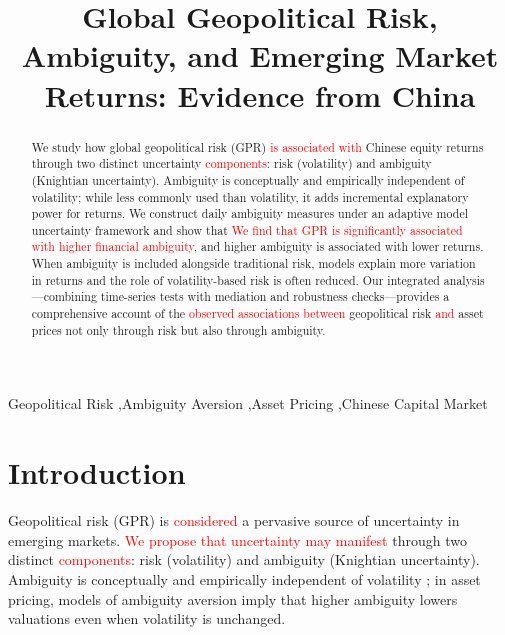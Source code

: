 \documentclass[preprint,12pt,authoryear]{elsarticle}
\begin{document}
\begin{frontmatter}

\title{Global Geopolitical Risk, Ambiguity, and Emerging Market Returns: Evidence from China}

\begin{abstract}
We study how global geopolitical risk (GPR) \textcolor{red}{is associated with} Chinese equity returns through two distinct uncertainty \textcolor{red}{components}: risk (volatility) and ambiguity (Knightian uncertainty). Ambiguity is conceptually and empirically independent of volatility; while less commonly used than volatility, it adds incremental explanatory power for returns. We construct daily ambiguity measures under an adaptive model uncertainty framework and show that \textcolor{red}{We find that GPR is significantly associated with higher financial ambiguity}, and higher ambiguity is associated with lower returns. When ambiguity is included alongside traditional risk, models explain more variation in returns and the role of volatility-based risk is often reduced. Our integrated analysis—combining time-series tests with mediation and robustness checks—provides a comprehensive account of the \textcolor{red}{observed associations between} geopolitical risk \textcolor{red}{and} asset prices not only through risk but also through ambiguity.
\end{abstract}

\begin{keyword}
Geopolitical Risk \sep Ambiguity Aversion \sep Asset Pricing \sep Chinese Capital Market 
\end{keyword}

\end{frontmatter}

\section{Introduction}

Geopolitical risk (GPR) is \textcolor{red}{considered} a pervasive source of uncertainty in emerging markets. \textcolor{red}{We propose that uncertainty may manifest} through two distinct \textcolor{red}{components}: risk (volatility) and ambiguity (Knightian uncertainty). Ambiguity is conceptually and empirically independent of volatility \citep{Knight1921, Ellsberg1961}; in asset pricing, models of ambiguity aversion \citep{Gilboa1989, Klibanoff2005} imply that higher ambiguity lowers valuations even when volatility is unchanged.
\end{document}
